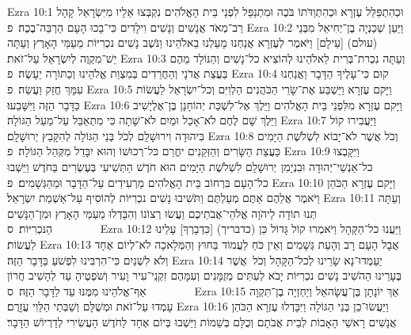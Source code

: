 Ezra 10:1	וּכְהִתְפַּלֵּל עֶזְרָא וּכְהִתְוַדֹּתוֹ בֹּכֶה וּמִתְנַפֵּל לִפְנֵי בֵּית הָאֱלֹהִים נִקְבְּצוּ אֵלָיו מִיִּשְׂרָאֵל קָהָל רַב־מְאֹד אֲנָשִׁים וְנָשִׁים וִילָדִים כִּי־בָכוּ הָעָם הַרְבֵּה־בֶכֶה׃ {פ}
Ezra 10:2	וַיַּעַן שְׁכַנְיָה בֶן־יְחִיאֵל מִבְּנֵי (עולם) [עֵילָם] וַיֹּאמֶר לְעֶזְרָא אֲנַחְנוּ מָעַלְנוּ בֵאלֹהֵינוּ וַנֹּשֶׁב נָשִׁים נכְרִיּוֹת מֵעַמֵּי הָאָרֶץ וְעַתָּה יֵשׁ־מִקְוֶה לְיִשְׂרָאֵל עַל־זֹאת׃
Ezra 10:3	וְעַתָּה נִכְרת־בְּרִית לֵאלֹהֵינוּ לְהוֹצִיא כל־נָשִׁים וְהַנּוֹלָד מֵהֶם בַּעֲצַת אֲדֹנָי וְהַחֲרֵדִים בְּמִצְוַת אֱלֹהֵינוּ וְכַתּוֹרָה יֵעָשֶׂה׃ {פ}
Ezra 10:4	קוּם כִּי־עָלֶיךָ הַדָּבָר וַאֲנַחְנוּ עִמָּךְ חֲזַק וַעֲשֵׂה׃ {פ}
Ezra 10:5	וַיָּקם עֶזְרָא וַיַּשְׁבַּע אֶת־שָׂרֵי הַכֹּהֲנִים הַלְוִיִּם וְכל־יִשְׂרָאֵל לַעֲשׂוֹת כַּדָּבָר הַזֶּה וַיִּשָּׁבֵעוּ׃
Ezra 10:6	וַיָּקם עֶזְרָא מִלִּפְנֵי בֵּית הָאֱלֹהִים וַיֵּלֶךְ אֶל־לִשְׁכַּת יְהוֹחָנָן בֶּן־אֶלְיָשִׁיב וַיֵּלֶךְ שָׁם לֶחֶם לֹא־אָכַל וּמַיִם לֹא־שָׁתָה כִּי מִתְאַבֵּל עַל־מַעַל הַגּוֹלָה׃
Ezra 10:7	וַיַּעֲבִירוּ קוֹל בִּיהוּדָה וִירוּשָׁלַ͏ִם לְכֹל בְּנֵי הַגּוֹלָה לְהִקָּבֵץ יְרוּשָׁלָ͏ִם׃
Ezra 10:8	וְכֹל אֲשֶׁר לֹא־יָבוֹא לִשְׁלֹשֶׁת הַיָּמִים כַּעֲצַת הַשָּׂרִים וְהַזְּקֵנִים יחֳרַם כּל־רְכוּשׁוֹ וְהוּא יִבָּדֵל מִקְּהַל הַגּוֹלָה׃ {פ}
Ezra 10:9	וַיִּקָּבְצוּ כל־אַנְשֵׁי־יְהוּדָה וּבִנְיָמִן  יְרוּשָׁלַ͏ִם לִשְׁלֹשֶׁת הַיָּמִים הוּא חֹדֶשׁ הַתְּשִׁיעִי בְּעֶשְׂרִים בַּחֹדֶשׁ וַיֵּשְׁבוּ כל־הָעָם בִּרְחוֹב בֵּית הָאֱלֹהִים מַרְעִידִים עַל־הַדָּבָר וּמֵהַגְּשָׁמִים׃ {פ}
Ezra 10:10	וַיָּקם עֶזְרָא הַכֹּהֵן וַיֹּאמֶר אֲלֵהֶם אַתֶּם מְעַלְתֶּם וַתֹּשִׁיבוּ נָשִׁים נכְרִיּוֹת לְהוֹסִיף עַל־אַשְׁמַת יִשְׂרָאֵל׃
Ezra 10:11	וְעַתָּה תְּנוּ תוֹדָה לַיהֹוָה אֱלֹהֵי־אֲבֹתֵיכֶם וַעֲשׂוּ רְצוֹנוֹ וְהִבָּדְלוּ מֵעַמֵּי הָאָרֶץ וּמִן־הַנָּשִׁים הַנּכְרִיּוֹת׃ {ס}        
Ezra 10:12	וַיַּעֲנוּ כל־הַקָּהָל וַיֹּאמְרוּ קוֹל גָּדוֹל כֵּן (כדבריך) [כִּדְבָרְךָ] עָלֵינוּ לַעֲשׂוֹת׃
Ezra 10:13	אֲבָל הָעָם רָב וְהָעֵת גְּשָׁמִים וְאֵין כֹּחַ לַעֲמוֹד בַּחוּץ וְהַמְּלָאכָה לֹא־לְיוֹם אֶחָד וְלֹא לִשְׁנַיִם כִּי־הִרְבִּינוּ לִפְשֹׁעַ בַּדָּבָר הַזֶּה׃
Ezra 10:14	יַעַמְדוּ־נָא שָׂרֵינוּ לְכל־הַקָּהָל וְכֹל  אֲשֶׁר בֶּעָרֵינוּ הַהֹשִׁיב נָשִׁים נכְרִיּוֹת יָבֹא לְעִתִּים מְזֻמָּנִים וְעִמָּהֶם זִקְנֵי־עִיר וָעִיר וְשֹׁפְטֶיהָ עַד לְהָשִׁיב חֲרוֹן אַף־אֱלֹהֵינוּ מִמֶּנּוּ עַד לַדָּבָר הַזֶּה׃ {ס}        
Ezra 10:15	אַךְ יוֹנָתָן בֶּן־עֲשָׂהאֵל וְיַחְזְיָה בֶן־תִּקְוָה עָמְדוּ עַל־זֹאת וּמְשֻׁלָּם וְשַׁבְּתַי הַלֵּוִי עֲזָרֻם׃
Ezra 10:16	וַיַּעֲשׂוּ־כֵן בְּנֵי הַגּוֹלָה וַיִּבָּדְלוּ עֶזְרָא הַכֹּהֵן אֲנָשִׁים רָאשֵׁי הָאָבוֹת לְבֵית אֲבֹתָם וְכֻלָּם בְּשֵׁמוֹת וַיֵּשְׁבוּ בְּיוֹם אֶחָד לַחֹדֶשׁ הָעֲשִׂירִי לְדַרְיוֹשׁ הַדָּבָר׃
